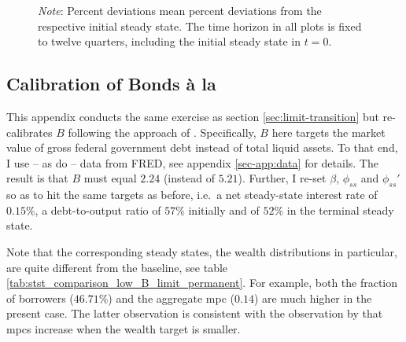 \documentclass[a4paper,12pt]{article} %
\numberwithin{equation}{section} %
\numberwithin{figure}{section}
\numberwithin{table}{section}
\begin{document}
\begin{refsection}
\begin{appendices}
\begin{figure}[H]
     \vspace{10pt}
     
     \justifying
     \footnotesize
	\textit{Note}: Percent deviations mean percent deviations from the respective initial steady state. The time horizon in all plots is fixed to twelve quarters, including the initial steady state in $t=0$.
\end{figure}

\subsection{Calibration of Bonds à la \textcite{bayer2023}}
\label{sec-app:robust-bonds}

This appendix conducts the same exercise as section \ref{sec:limit-transition} but re-calibrates $B$ following the approach of \textcite{bayer2023}. Specifically, $B$ here targets the market value of gross federal government debt instead of total liquid assets. To that end, I use -- as \textcite{bayer2023} do -- data from FRED, see appendix \ref{sec-app:data} for details. The result is that $B$ must equal $2.24$ (instead of $5.21$). Further, I re-set $\beta$, $\phi_{ss}$ and $\phi_{ss}'$ so as to hit the same targets as before, i.e.~a net steady-state interest rate of $0.15\%$, a debt-to-output ratio of $57\%$ initially and of $52\%$ in the terminal steady state.

Note that the corresponding steady states, the wealth distributions in particular, are quite different from the baseline, see table \ref{tab:stst_comparison_low_B_limit_permanent}. For example, both the fraction of borrowers ($46.71\%$) and the aggregate \Gls{mpc} ($0.14$) are much higher in the present case. The latter observation is consistent with the observation by \textcite{kaplan2018} that \Gls{mpc}s increase when the wealth target is smaller.


\end{appendices}
\end{refsection}
\end{document}
